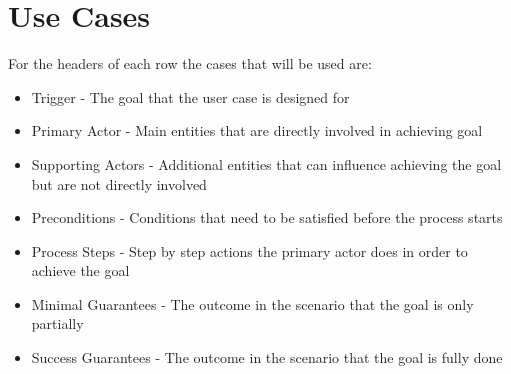 %
%
%                 

\chapter{Use Cases}
\label{sec:appendixc}

For the headers of each row the cases that will be used are: 
\begin{itemize}
    \item Trigger - The goal that the user case is designed for
    \item Primary Actor - Main entities that are directly involved in achieving goal
    \item Supporting Actors - Additional entities that can influence achieving the goal but are not directly involved
    \item Preconditions - Conditions that need to be satisfied before the process starts
    \item Process Steps - Step by step actions the primary actor does in order to achieve the goal
    \item Minimal Guarantees - The outcome in the scenario that the goal is only partially
    \item Success Guarantees - The outcome in the scenario that the goal is fully done

\end{itemize}

%
%
%
%

